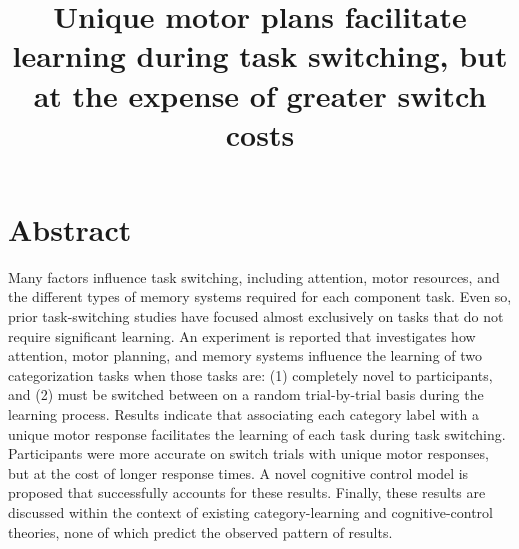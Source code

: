 \documentclass[doc, floatsintext]{apa7}
\title{Unique motor plans facilitate learning during task
switching, but at the expense of greater switch costs}
\begin{document}
\maketitle
\newpage

\section{Abstract}
Many factors influence task switching, including attention,
motor resources, and the different types of memory systems
required for each component task. Even so, prior
task-switching studies have focused almost exclusively on
tasks that do not require significant learning. An
experiment is reported that investigates how attention,
motor planning, and memory systems influence the learning of
two categorization tasks when those tasks are: (1)
completely novel to participants, and (2) must be switched
between on a random trial-by-trial basis during the learning
process.  Results indicate that associating each category
label with a unique motor response facilitates the learning
of each task during task switching. Participants were more
accurate on switch trials with unique motor responses, but
at the cost of longer response times. A novel cognitive
control model is proposed that successfully accounts for
these results.  Finally, these results are discussed within
the context of existing category-learning and
cognitive-control theories, none of which predict the
observed pattern of results.
\end{document}

